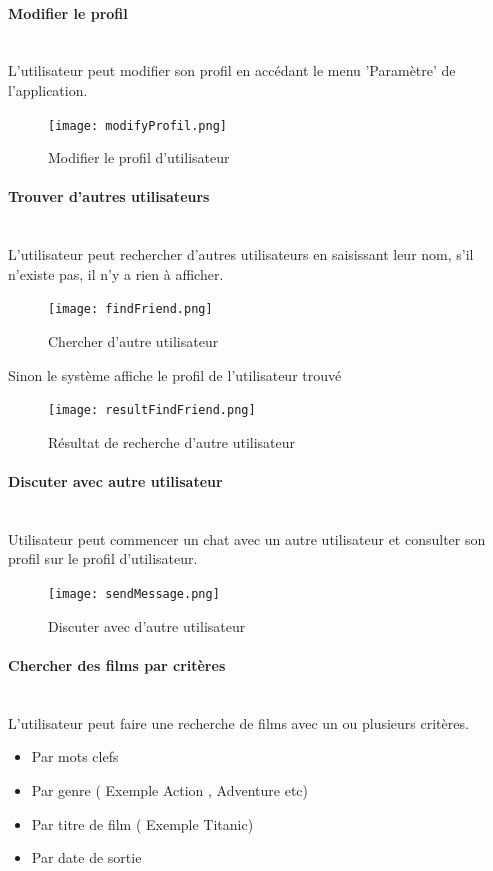 \documentclass[12pt]{article}
\begin{document}
\paragraph{Modifier le profil}
\leavevmode \\
L'utilisateur peut modifier son profil en accédant le menu 'Paramètre' de l'application.
\begin{figure}[H]
    \centering
    \texttt{[image: modifyProfil.png]}
    \caption{Modifier le profil d'utilisateur}
    \label{fig:App_ModifProfil}
\end{figure}

\paragraph{Trouver d'autres utilisateurs}
\leavevmode \\
L'utilisateur peut rechercher d'autres utilisateurs en saisissant leur nom, s'il n'existe pas, il n'y a rien à afficher.
\begin{figure}[H]
    \centering
    \texttt{[image: findFriend.png]}
    \caption{Chercher d'autre utilisateur}
    \label{fig:App_findFriend}
\end{figure}
Sinon le système affiche le profil de l'utilisateur trouvé
\begin{figure}[H]
    \centering
    \texttt{[image: resultFindFriend.png]}
    \caption{Résultat de recherche d'autre utilisateur}
    \label{fig:App_resultFriendFind}
\end{figure}

\paragraph{Discuter avec autre utilisateur} 
\leavevmode \\
Utilisateur peut commencer un chat  avec un autre utilisateur et  consulter son profil sur le profil d'utilisateur.
\begin{figure}[H]
    \centering
    \texttt{[image: sendMessage.png]}
    \caption{Discuter avec d'autre utilisateur}
    \label{fig:App_sendMessage}
\end{figure}


\paragraph{Chercher des films par critères} 
\leavevmode \\
  L'utilisateur peut faire une recherche de films avec un ou plusieurs critères.
    \begin{itemize}
        \item Par mots clefs
        \item Par genre ( Exemple Action , Adventure etc)
        \item Par titre de film ( Exemple Titanic)
        \item Par date de sortie
    \end{itemize}
    
\end{document}
